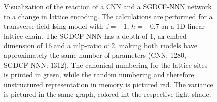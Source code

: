 
\begin{figure}[htbp]
    \centering
    \caption{
        Visualization of the reaction of a CNN and a SGDCF-NNN network to a change in lattice encoding.
        The calculations are performed for a transverse field Ising model with $J = -1$, $h=-0.7$ on a 1D-linear lattice chain.
        The SGDCF-NNN has a depth of 1, an embed dimension of 16 and a mlp-ratio of 2, making both models have approximately the same number of parameters (CNN: 1280, SGDCF-NNN: 1312).
        The canonical numbering for the lattice sites is printed in green, while the random numbering and therefore unstructured representation in memory is pictured red. 
        The variance is pictured in the same graph, colored int the respective light shade.
    }
    \label{fig:resiliency-encoding}
\end{figure}